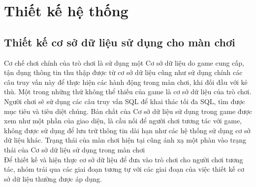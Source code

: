 \section{Thiết kế hệ thống}
\subsection{Thiết kế cơ sở dữ liệu sử dụng cho màn chơi}
\hspace*{0.5cm} Cơ chế chơi chính của trò chơi là sử dụng một Cơ sở dữ liệu do game cung cấp, tận dụng thông tin thu thập được từ cơ sở dữ liệu cũng như sử dụng chính các câu truy vấn này để thực hiện các hành động trong màn chơi, khi đối đầu với kẻ thù. Một trong những thứ không thể thiếu của game là cơ sở dữ liệu của trò chơi. Người chơi sẽ sử dụng các câu truy vấn SQL để khai thác tối đa SQL, tìm được mục tiêu và tiêu diệt chúng. Bản chất của Cơ sở dữ liệu sử dụng trong game được xem như một phần của giao diện, là cầu nối để người chơi tương tác với game, không được sử dụng để lưu trữ thông tin dài hạn như các hệ thống sử dụng cơ sở dữ liệu khác. Trạng thái của màn chơi hiện tại cũng ánh xạ một phàn vào trạng thái của Cơ sở dữ liệu sử dụng trong màn chơi\\
\hspace*{0.5cm} Để thiết kế và hiện thực cơ sở dữ liệu để đưa vào trò chơi cho người chơi tương tác, nhóm trải qua các giai đoạn tương tự với các giai đoạn của việc thiết kế cơ sở dữ liệu thường được áp dụng.
